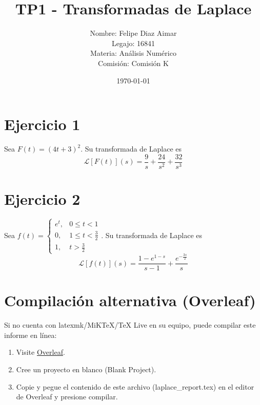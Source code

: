 \documentclass[12pt]{article}
\title{TP1 - Transformadas de Laplace}
\author{Nombre: Felipe Diaz Aimar \\Legajo: 16841 \\Materia: Análisis Numérico \\Comisión: Comisión K}
\date{\today}
\begin{document}
\maketitle

\section*{Ejercicio 1}
Sea $F(t) = \left(4 t + 3\right)^{2}$. Su transformada de Laplace es
\[
\mathcal{L}[F(t)](s) = \frac{9}{s} + \frac{24}{s^{2}} + \frac{32}{s^{3}}
\]

\section*{Ejercicio 2}
Sea $f(t) = \begin{cases} e^{t}, & 0 \le t < 1 \\ 0, & 1 \le t < \tfrac{3}{2} \\ 1, & t > \tfrac{3}{2} \end{cases}$. Su transformada de Laplace es
\[
\mathcal{L}[f(t)](s) = \frac{1 - e^{1 - s}}{s - 1} + \frac{e^{- \frac{3 s}{2}}}{s}
\]

\section*{Compilación alternativa (Overleaf)}
Si no cuenta con latexmk/MiKTeX/TeX Live en su equipo, puede compilar este informe en línea:
\begin{enumerate}
    \item Visite \href{https://www.overleaf.com}{Overleaf}.
    \item Cree un proyecto en blanco (Blank Project).
    \item Copie y pegue el contenido de este archivo (laplace\_report.tex) en el editor de Overleaf y presione compilar.
\end{enumerate}
\end{document}
